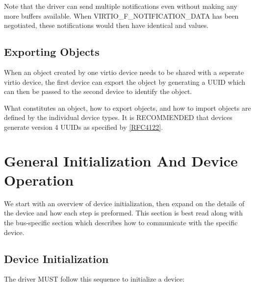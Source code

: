 Note that the driver can send multiple notifications even without
making any more buffers available. When VIRTIO_F_NOTIFICATION_DATA
has been negotiated, these notifications would then have
identical  and  values.



\section{Exporting Objects}\label{sec:Basic Facilities of a Virtio Device / Exporting Objects}

When an object created by one virtio device needs to be
shared with a seperate virtio device, the first device can
export the object by generating a UUID which can then
be passed to the second device to identify the object.

What constitutes an object, how to export objects, and
how to import objects are defined by the individual device
types. It is RECOMMENDED that devices generate version 4
UUIDs as specified by \hyperref[intro:rfc4122]{[RFC4122]}.



\chapter{General Initialization And Device Operation}\label{sec:General Initialization And Device Operation}

We start with an overview of device initialization, then expand on the
details of the device and how each step is preformed.  This section
is best read along with the bus-specific section which describes
how to communicate with the specific device.

\section{Device Initialization}\label{sec:General Initialization And Device Operation / Device Initialization}

The driver MUST follow this sequence to initialize a device:

